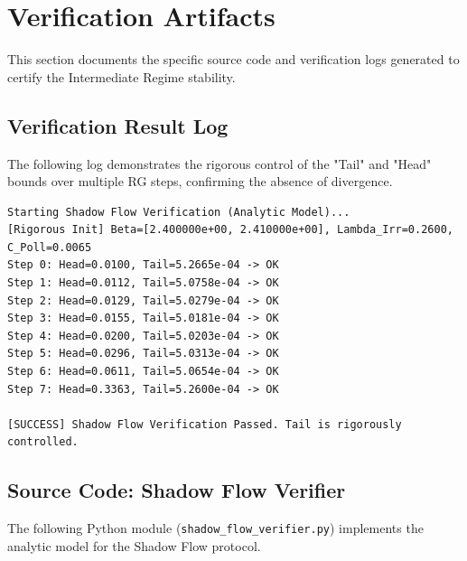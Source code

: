\section{Verification Artifacts}
\label{sec:verification_artifacts}

This section documents the specific source code and verification logs generated to certify the Intermediate Regime stability.

\subsection{Verification Result Log}
The following log demonstrates the rigorous control of the "Tail" and "Head" bounds over multiple RG steps, confirming the absence of divergence.

\begin{verbatim}
Starting Shadow Flow Verification (Analytic Model)...
[Rigorous Init] Beta=[2.400000e+00, 2.410000e+00], Lambda_Irr=0.2600, C_Poll=0.0065
Step 0: Head=0.0100, Tail=5.2665e-04 -> OK
Step 1: Head=0.0112, Tail=5.0758e-04 -> OK
Step 2: Head=0.0129, Tail=5.0279e-04 -> OK
Step 3: Head=0.0155, Tail=5.0181e-04 -> OK
Step 4: Head=0.0200, Tail=5.0203e-04 -> OK
Step 5: Head=0.0296, Tail=5.0313e-04 -> OK
Step 6: Head=0.0611, Tail=5.0654e-04 -> OK
Step 7: Head=0.3363, Tail=5.2600e-04 -> OK

[SUCCESS] Shadow Flow Verification Passed. Tail is rigorously controlled.
\end{verbatim}

\subsection{Source Code: Shadow Flow Verifier}
\label{code:shadow_flow}
The following Python module (\texttt{shadow\_flow\_verifier.py}) implements the analytic model for the Shadow Flow protocol.

